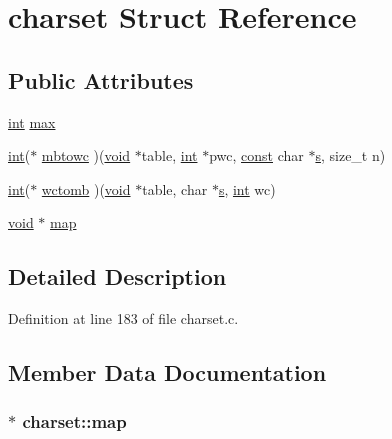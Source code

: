 \hypertarget{structcharset}{}\section{charset Struct Reference}
\label{structcharset}
\subsection*{Public Attributes}
\begin{DoxyCompactItemize}
\item 
\hyperlink{xmltok_8h_a5a0d4a5641ce434f1d23533f2b2e6653}{int} \hyperlink{structcharset_a35a17409926016f4c01050cac42aecab}{max}
\item 
\hyperlink{xmltok_8h_a5a0d4a5641ce434f1d23533f2b2e6653}{int}($\ast$ \hyperlink{structcharset_ae21c41c91c92a31fc7c01f5e5691ab58}{mbtowc} )(\hyperlink{sound_8c_ae35f5844602719cf66324f4de2a658b3}{void} $\ast$table, \hyperlink{xmltok_8h_a5a0d4a5641ce434f1d23533f2b2e6653}{int} $\ast$pwc, \hyperlink{getopt1_8c_a2c212835823e3c54a8ab6d95c652660e}{const} char $\ast$\hyperlink{lib_2expat_8h_a755339d27872b13735c2cab829e47157}{s}, size\+\_\+t n)
\item 
\hyperlink{xmltok_8h_a5a0d4a5641ce434f1d23533f2b2e6653}{int}($\ast$ \hyperlink{structcharset_a75074c655bc7a6d4f1b2214891894843}{wctomb} )(\hyperlink{sound_8c_ae35f5844602719cf66324f4de2a658b3}{void} $\ast$table, char $\ast$\hyperlink{lib_2expat_8h_a755339d27872b13735c2cab829e47157}{s}, \hyperlink{xmltok_8h_a5a0d4a5641ce434f1d23533f2b2e6653}{int} wc)
\item 
\hyperlink{sound_8c_ae35f5844602719cf66324f4de2a658b3}{void} $\ast$ \hyperlink{structcharset_a0f53b6016491dd02ea1a9d752e445989}{map}
\end{DoxyCompactItemize}


\subsection{Detailed Description}


Definition at line 183 of file charset.\+c.



\subsection{Member Data Documentation}
\subsubsection[{\texorpdfstring{map}{map}}]{$\ast$ charset\+::map}\hypertarget{structcharset_a0f53b6016491dd02ea1a9d752e445989}{}\label{structcharset_a0f53b6016491dd02ea1a9d752e445989}


